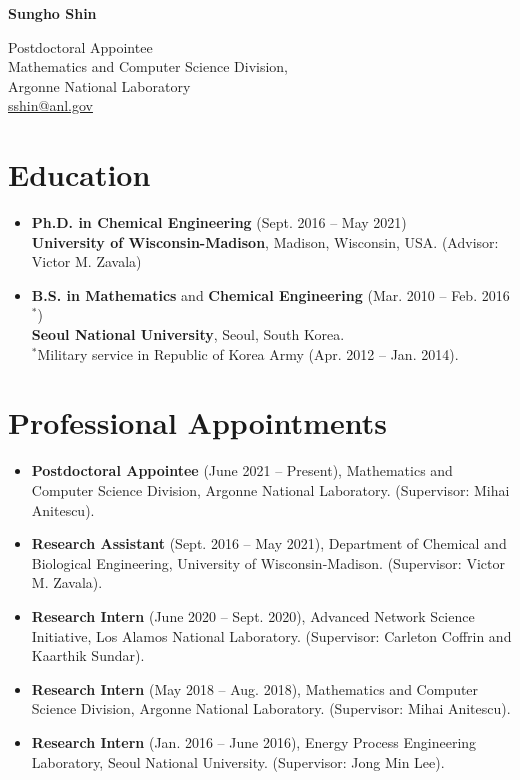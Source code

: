 \documentclass{article}
\begin{document}
\begin{center}
  {\bf\LARGE Sungho Shin}
\end{center}
\begin{center}
  {Postdoctoral Appointee}\\
  {Mathematics and Computer Science Division},\\
  {Argonne National Laboratory}\\
  \href{mailto:sshin@anl.gov}{sshin@anl.gov}
\end{center}

\section*{Education}
\begin{itemize}[leftmargin=*]
\item[]{\bf Ph.D. in Chemical Engineering} (Sept. 2016 -- May 2021)\\
  {\bf University of Wisconsin-Madison}, Madison, Wisconsin, USA. (Advisor: Victor M. Zavala)
\item[]{\bf B.S. in Mathematics} and {\bf Chemical Engineering} (Mar. 2010 -- Feb. 2016$^*$)\\
  {\bf Seoul National University}, Seoul, South Korea.\\
  $^*$Military service in Republic of Korea Army (Apr. 2012 -- Jan. 2014).
\end{itemize}

\section*{Professional Appointments}
\begin{itemize}[leftmargin=*]
\item[] {\bf Postdoctoral Appointee} (June 2021 -- Present), Mathematics and Computer Science Division, Argonne National Laboratory. (Supervisor: Mihai Anitescu).
\item[] {\bf Research Assistant} (Sept. 2016 -- May 2021), Department of Chemical and Biological Engineering, University of Wisconsin-Madison. (Supervisor: Victor M. Zavala).
\item[] {\bf Research Intern} (June 2020 -- Sept. 2020), Advanced Network Science Initiative, Los Alamos National Laboratory. (Supervisor: Carleton Coffrin and Kaarthik Sundar).
\item[] {\bf Research Intern} (May 2018 -- Aug. 2018), Mathematics and Computer Science Division, Argonne National Laboratory. (Supervisor: Mihai Anitescu).
\item[] {\bf Research Intern} (Jan. 2016 -- June 2016), Energy Process Engineering Laboratory, Seoul National University. (Supervisor: Jong Min Lee).
\end{itemize}
\end{document}
